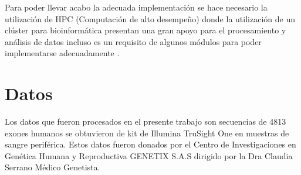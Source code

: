 Para poder llevar acabo la adecuada implementación se hace necesario la utilización de HPC (Computación de alto desempeño) donde la utilización de un clúster para bioinformática presentan una gran apoyo para el procesamiento y análisis de datos incluso es un requisito de algunos módulos para poder implementarse adecuadamente \cite{Fisch2015}.

\section{Datos}

Los datos que fueron procesados en el presente trabajo son secuencias de 4813 exones humanos se obtuvieron de kit de Illumina TruSight One en muestras de sangre periférica. Estos datos  fueron donados por el Centro de Investigaciones en Genética Humana y Reproductiva GENETIX S.A.S dirigido por la Dra Claudia Serrano Médico Genetista. \\

